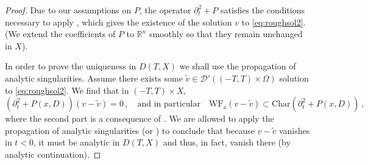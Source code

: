 \documentclass[
	fontsize=11pt, 
	twoside=false, 
	abstract=true, 
	a4paper,
]{scrartcl}
\newcommand{\RR}{\mathbb{R}}
\newcommand{\del}{\partial}
\newcommand{\supp}{\mathrm{supp}}
\newcommand{\td}[1]{\tilde{#1}}
\newcommand{\wf}{\mathrm{WF}_{\mathrm{a}}}
\begin{document}
\begin{proof}
	Due to our assumptions on $P$, the operator $\del_t^2+P$ satisfies the conditions necessary to apply \cite[Thm.~23.2.4]{zbMATH05129478}, which gives the existence of %
	the solution $v$ to %
	\cref{eq:roughsol2}. (We extend the coefficients of $P$ to $\RR^n$ smoothly so that they remain unchanged in $X$).

	In order to prove the uniqueness in $D(T,X)$ we shall use the propagation of analytic singularities. Assume there exists some $\td{v} \in \mathcal{D}'((-T,T)\times\Omega)$ solution to \cref{eq:roughsol2}. We find that in $(-T,T)\times X$,
	\[
		(\del_t^2+P(x,D))(v-\td{v}) = 0\,,\quad \text{and in particular}\quad \wf(v-\td{v}) \subset \mathrm{Char}(\del_t^2+P(x,D))\,,
	\]
	where the second part is a consequence of \cite[Thm.~8.6.1]{hoermander1}. We are allowed to apply the propagation of analytic singularities \cite[Thm.~7.3]{hoermander1} (or \cite[Thm.~9.1]{AST_1982__95__R3_0}) to conclude that because $v-\td{v}$ vanishes in $t<0$, it must be analytic in $D(T,X)$ and thus, in fact, vanish there (by analytic continuation).
\end{proof}
\end{document}
